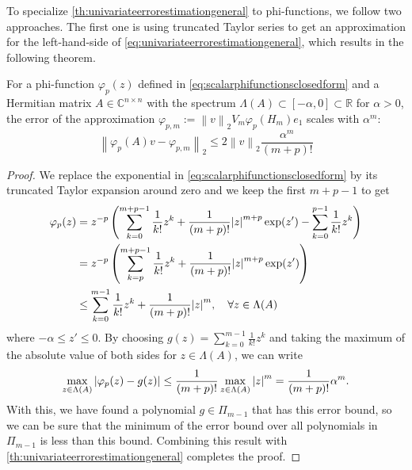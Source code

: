 To specialize \autoref{th:univariateerrorestimationgeneral} to phi-functions, we follow two approaches. The
first one is using truncated Taylor series to get an approximation for the left-hand-side of
\autoref{eq:univariateerrorestimationgeneral}, which results in the following theorem.

\begin{lemma}
    \label{th:univariateerrorestimationphitaylor}
    For a phi-function $\varphi_p(z)$ defined in \autoref{eq:scalarphifunctionsclosedform} and a Hermitian matrix
    $A \in \mathbb{C}^{n \times n}$ with the spectrum $\Lambda(A) \subset [-\alpha, 0] \subset \mathbb{R}$ for $\alpha > 0$,
    the error of the approximation $\varphi_{p, m} := \left\| v \right\|_{2} V_m \varphi_p(H_m) e_1$ scales with
    $\alpha^m$:
    \begin{equation}
        \label{eq:univariateerrorestimationphitaylor}
        \left\| \varphi_p(A)v - \varphi_{p, m} \right\|_2 \le 2 \left\| v \right\|_2 \frac{\alpha^m}{(m+p)!}
    \end{equation}
\end{lemma}
\begin{proof}
    We replace the exponential in \autoref{eq:scalarphifunctionsclosedform} by its truncated Taylor expansion
    around zero and we keep the first $m+p-1$ to get
    \begin{equation*}
        \begin{aligned}
            \varphi_p(z) & = z^{-p} \left( \sum_{k=0}^{m+p-1}{\frac{1}{k!}z^k}
                + \frac{1}{(m+p)!} \abs{z}^{m+p} \exp(z') - \sum_{k=0}^{p-1}{\frac{1}{k!}z^{k}} \right)\\
            & = z^{-p} \left( \sum_{k=p}^{m+p-1}{\frac{1}{k!}z^k} + \frac{1}{(m+p)!} \abs{z}^{m+p} \exp(z') \right)\\
            & \le \sum_{k=0}^{m-1}{\frac{1}{k!}z^k} + \frac{1}{(m+p)!} \abs{z}^{m}, \quad \forall z \in \Lambda(A)
            \end{aligned}
    \end{equation*}
    where $-\alpha \le z' \le 0$. By choosing $g(z) = \sum_{k=0}^{m-1}{\frac{1}{k!}z^k}$ and taking the maximum of the
    absolute value of both sides for $z \in \Lambda(A)$, we can write
    \begin{equation*}
        \max_{z \in \Lambda(A)}\left| \varphi_p(z) - g(z) \right|
        \le \frac{1}{(m+p)!} \max_{z \in \Lambda(A)}\abs{z}^{m}
        = \frac{1}{(m+p)!} \alpha^m.
    \end{equation*}
    With this, we have found a polynomial $g \in \Pi_{m-1}$ that has this error bound, so we can be sure that
    the minimum of the error bound over all polynomials in $\Pi_{m-1}$ is less than this bound. Combining this
    result with \autoref{th:univariateerrorestimationgeneral} completes the proof.
\end{proof}

